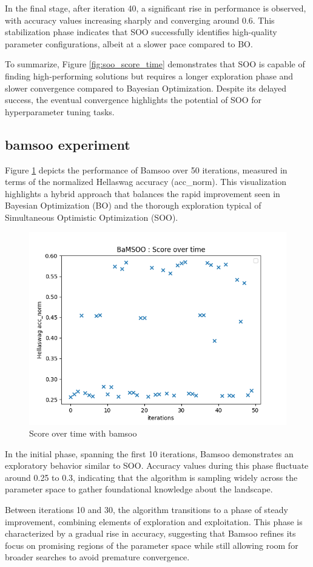 In the final stage, after iteration 40, a significant rise in performance is observed, with accuracy values increasing sharply and converging around 0.6. This stabilization phase indicates that SOO successfully identifies high-quality parameter configurations, albeit at a slower pace compared to BO.

To summarize, Figure \ref{fig:soo_score_time} demonstrates that SOO is capable of finding high-performing solutions but requires a longer exploration phase and slower convergence compared to Bayesian Optimization. Despite its delayed success, the eventual convergence highlights the potential of SOO for hyperparameter tuning tasks.

\subsection{\acrshort{bamsoo} experiment}
\label{sec:bamsoo_exp}

Figure \ref{fig:bamsoo_score_time} depicts the performance of Bamsoo over 50 iterations, measured in terms of the normalized Hellaswag accuracy (acc\_norm). This visualization highlights a hybrid approach that balances the rapid improvement seen in Bayesian Optimization (BO) and the thorough exploration typical of Simultaneous Optimistic Optimization (SOO).

\begin{figure}[h!] \centering \includegraphics[width=0.4\linewidth]{assets/img/chap_4/experiments/plots/exp11_score_over_time.png} \caption{Score over time with \acrshort{bamsoo}} \label{fig:bamsoo_score_time} \end{figure}

In the initial phase, spanning the first 10 iterations, Bamsoo demonstrates an exploratory behavior similar to SOO. Accuracy values during this phase fluctuate around 0.25 to 0.3, indicating that the algorithm is sampling widely across the parameter space to gather foundational knowledge about the landscape.

Between iterations 10 and 30, the algorithm transitions to a phase of steady improvement, combining elements of exploration and exploitation. This phase is characterized by a gradual rise in accuracy, suggesting that Bamsoo refines its focus on promising regions of the parameter space while still allowing room for broader searches to avoid premature convergence.

